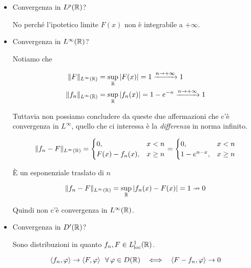 \begin{itemize}
\item Convergenza in $L^{p}(\mathbb{R})$?

No perché l'ipotetico limite $F(x)$ non è integrabile a $ + \infty $.
\item Convergenza in $L^{\infty}(\mathbb{R})$?

Notiamo che

\begin{equation*}
\begin{aligned}
\Vert F\Vert_{L^{\infty}(\mathbb{R})} & = \sup_{\mathbb{R}}| F(x)| = 1\xrightarrow{n\rightarrow + \infty} 1\\
\Vert f_{n}\Vert_{L^{\infty}(\mathbb{R})} & = \sup_{\mathbb{R}}| f_{n}(x)| = 1 - e^{- n}\xrightarrow{n\rightarrow + \infty} 1
\end{aligned}
\end{equation*}

Tuttavia non possiamo concludere da queste due affermazioni che c'è convergenza in $L^{\infty}$, quello che ci interessa è la \textit{differenza} in norma infinito.

\begin{equation*}
\Vert f_{n} - F\Vert_{L^{\infty}(\mathbb{R})} = 
\begin{cases}
0, & x < n\\
F(x) - f_{n}(x), & x \geq n
\end{cases} = 
\begin{cases}
0, & x < n\\
1 - e^{n - x}, & x \geq n
\end{cases}
\end{equation*}

È un esponenziale traslato di $n$

\begin{equation*}
\Vert f_{n} - F\Vert_{L^{\infty}(\mathbb{R})} = \sup_{\mathbb{R}}| f_{n}(x) - F(x)| = 1\nrightarrow 0
\end{equation*}

Quindi non c'è convergenza in $L^{\infty}(\mathbb{R})$.
\item Convergenza in $D'(\mathbb{R})$?

Sono distribuzioni in quanto $f_{n}, F\in L^{1}_{\operatorname{loc}}(\mathbb{R})$.

\begin{equation*}
\langle f_{n}, \varphi \rangle \rightarrow \langle F, \varphi \rangle \ \ \forall \varphi \in D(\RR) \ \ \iff \ \ \langle F - f_{n}, \varphi \rangle \rightarrow 0
\end{equation*}


\end{itemize}

